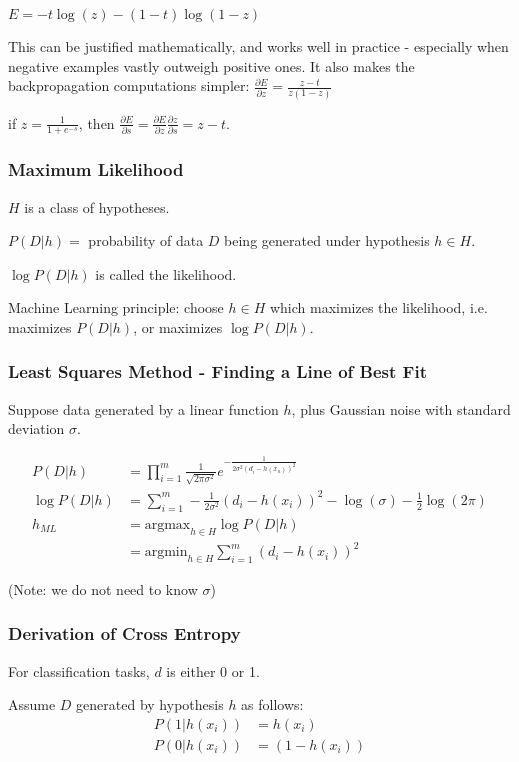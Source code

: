 {\centering
    $E = -t\log(z) - (1 - t)\log(1 - z)$

}

This can be justified mathematically, and works well in practice - especially
when negative examples vastly outweigh positive ones. It also makes the
backpropagation computations simpler: $\frac{\partial E}{\partial z} = \frac{z
- t}{z(1 - z)}$

if $z = \frac{1}{1 + e^{-s}}$, then $\frac{\partial E}{\partial s} =
\frac{\partial E}{\partial z} \frac{\partial z}{\partial s} = z - t$.

\subsubsection{Maximum Likelihood}
$H$ is a class of hypotheses.

$P(D|h) = $ probability of data $D$ being generated under hypothesis $h \in H$.

$\log P(D|h)$ is called the likelihood.

Machine Learning principle: choose $h \in H$ which maximizes the likelihood,
i.e. maximizes $P(D|h)$, or maximizes $\log P(D|h)$.

\subsubsection{Least Squares Method - Finding a Line of Best Fit}
Suppose data generated by a linear function $h$, plus Gaussian noise with
standard deviation $\sigma$.

\begin{align*}
    P(D|h) &= \prod_{i = 1}^m \frac{1}{\sqrt{2\pi\sigma^2}}e^{-\frac{1}{2\sigma^2 (d_i - h(x_u))^2}}\\
    \log P(D|h) &= \sum_{i = 1}^m -\frac{1}{2\sigma^2} (d_i - h(x_i))^2 - \log(\sigma) - \frac{1}{2} \log(2\pi)\\
    h_{ML} &= \text{argmax}_{h \in H} \log P(D|h)\\
           &= \text{argmin}_{h \in H} \sum_{i = 1}^m (d_i - h(x_i))^2
\end{align*}

(Note: we do not need to know $\sigma$)

\subsubsection{Derivation of Cross Entropy}
For classification tasks, $d$ is either 0 or 1.

Assume $D$ generated by hypothesis $h$ as follows:
\begin{align*}
    P(1 | h(x_i)) &= h(x_i)\\
    P(0 | h(x_i)) &= (1-h(x_i))
\end{align*}

